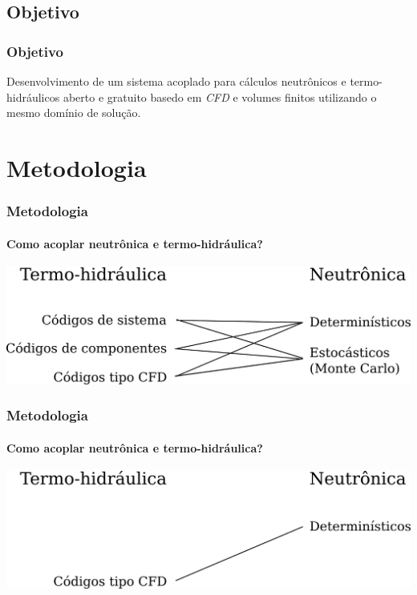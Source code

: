 \documentclass[svgnames,smaller,table]{beamer}
\begin{document}
\subsection{Objetivo}
\begin{frame}
  \frametitle{Objetivo}

\Large{Desenvolvimento de um sistema acoplado para cálculos neutrônicos e
  termo-hidráulicos aberto e gratuito basedo em \textit{CFD} e
  volumes finitos utilizando o mesmo domínio de solução.}
  
\end{frame}

\section{Metodologia}
\begin{frame}
  \frametitle{Metodologia}
  \framesubtitle{Como acoplar neutrônica e termo-hidráulica?}
  \includegraphics[scale=0.8]{../figuras/th-neu-1.png}
\end{frame}

\begin{frame}[noframenumbering]
  \frametitle{Metodologia}
  \framesubtitle{Como acoplar neutrônica e termo-hidráulica?}
  \includegraphics[scale=0.8]{../figuras/th-neu-4.png}
\end{frame}
\end{document}
